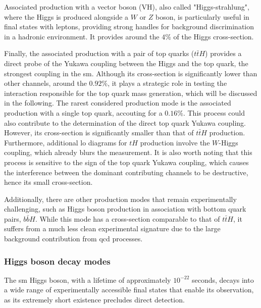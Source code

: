 Associated production with a vector boson (VH), also called "Higgs-strahlung", where the Higgs is produced alongside a $W$ or $Z$ boson, is particularly useful in final states with leptons, providing strong handles for background discrimination in a hadronic environment. It provides around the $4\%$ of the Higgs cross-section.

Finally, the associated production with a pair of top quarks ($t\bar{t}H$) provides a direct probe of the Yukawa coupling between the Higgs and the top quark, the strongest coupling in the \acrshort{sm}. Although its cross-section is significantly lower than other channels, around the $0.92\%$, it plays a strategic role in testing the interaction responsible for the top quark mass generation, which will be discussed in the following.
The rarest considered production mode is the associated production with a single top quark, accouting for a $0.16\%$. This process could also contribute to the determination of the direct top quark Yukawa coupling. However, its cross-section is significantly smaller than that of \( t\bar{t}H \) production. Furthermore, additional \acrshort{lo} diagrams for \( tH \) production involve the \( W \)-Higgs coupling, which already blurs the measurement. It is also worth noting that this process is sensitive to the sign of the top quark Yukawa coupling, which causes the interference between the dominant contributing channels to be destructive, hence its small cross-section.

Additionally, there are other production modes that remain experimentally challenging, such as Higgs boson production in association with bottom quark pairs, \( b\bar{b}H \). While this mode has a cross-section comparable to that of \( t\bar{t}H \), it suffers from a much less clean experimental signature due to the large background contribution from \acrshort{qcd} processes.

\subsubsection*{Higgs boson decay modes}
\label{sec:higgs_decay}

The \acrshort{sm} Higgs boson, with a lifetime of approximately \(10^{-22}\) seconds, decays into a wide range of experimentally accessible final states that enable its observation, as its extremely short existence precludes direct detection.

